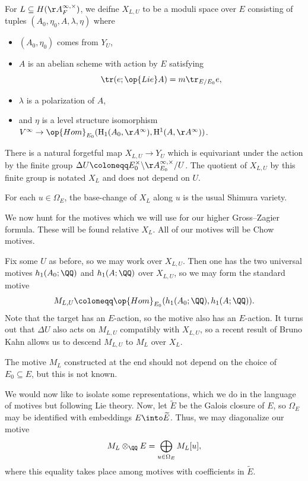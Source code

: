 \documentclass{article}
\begin{document}
\begin{notation}
	For $L\subseteq H(\AA_F^{\infty,\times})$, we deifne $X_{L,U}$ to be a moduli space over $E$ consisting of tuples $(A_0,\eta_0,A,\lambda,\eta)$ where
	\begin{itemize}
		\item $(A_0,\eta_0)$ comes from $Y_U$,
		\item $A$ is an abelian scheme with action by $E$ satisfying
		\[\tr(e;\op{Lie}A)=m\tr_{E/E_0}e,\]
		\item $\lambda$ is a polarization of $A$,
		\item and $\eta$ is a level structure isomorphism $V^\infty\to\op{Hom}_{E_0}(\mathrm H_1(A_0,\AA^\infty),\mathrm H^1(A,\AA^\infty))$.
	\end{itemize}
\end{notation}
\begin{remark}
	There is a natural forgetful map $X_{L,U}\to Y_U$ which is equivariant under the action by the finite group $\Delta U\coloneqq E_0^\times\backslash\AA_{E_0}^{\infty,\times}/U$. The quotient of $X_{L,U}$ by this finite group is notated $X_L$ and does not depend on $U$.
\end{remark}
\begin{remark}
	For each $u\in\Omega_E$, the base-change of $X_L$ along $u$ is the usual Shimura variety.
\end{remark}
We now hunt for the motives which we will use for our higher Gross--Zagier formula. These will be found relative $X_L$. All of our motives will be Chow motives.

Fix some $U$ as before, so we may work over $X_{L,U}$. Then one has the two universal motives $h_1(A_0;\QQ)$ and $h_1(A;\QQ)$ over $X_{L,U}$, so we may form the standard motive
\[M_{L,U}\coloneqq\op{Hom}_{E_0}(h_1(A_0;\QQ),h_1(A;\QQ)).\]
Note that the target has an $E$-action, so the motive also has an $E$-action. It turns out that $\Delta U$ also acts on $M_{L,U}$ compatibly with $X_{L,U}$, so a recent result of Bruno Kahn allows us to descend $M_{L,U}$ to $M_L$ over $X_L$.
\begin{remark}
	The motive $M_L$ constructed at the end should not depend on the choice of $E_0\subseteq E$, but this is not known.
\end{remark}
We would now like to isolate some representations, which we do in the language of motives but following Lie theory. Now, let $\widetilde E$ be the Galois closure of $E$, so $\Omega_E$ may be identified with embeddings $E\into\widetilde E$. Thus, we may diagonalize our motive
\[M_L\otimes_\QQ E=\bigoplus_{u\in\Omega_E}M_L[u],\]
where this equality takes place among motives with coefficients in $\widetilde E$.
\end{document}
